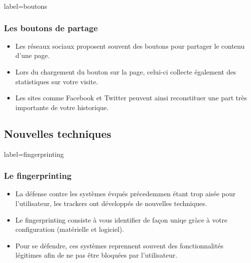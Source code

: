 \documentclass{beamer}
\begin{document}
        \begin{frame}{label=boutons}
            \frametitle{Les boutons de partage}
            \begin{center}
                \begin{itemize}
                    \item Les réseaux sociaux proposent souvent des boutons pour partager le contenu d'une page.
                    \item Lors du chargement du bouton sur la page, celui-ci collecte également des statistiques sur votre visite.
                    \item Les sites comme Facebook et Twitter peuvent ainsi reconstituer une part très importante de votre historique.
                \end{itemize}
            \end{center}
        \end{frame}
    \subsection{Nouvelles techniques}
        \begin{frame}{label=fingerprinting}
            \frametitle{Le fingerprinting}
            \begin{center}
                \begin{itemize}
                    \item La défense contre les systèmes évqués précedemmen étant trop aisée pour l'utilisateur, les trackers ont développés de nouvelles techniques.
                    \item Le fingerprinting consiste à vous identifier de façon uniqe gràce à votre configuration (matérielle et logiciel).
                    \item Pour se défendre, ces systèmes reprennent souvent des fonctionnalités légitimes afin de ne pas être bloquées par l'utilisateur.
                \end{itemize}
            \end{center}
        \end{frame}
\end{document}
